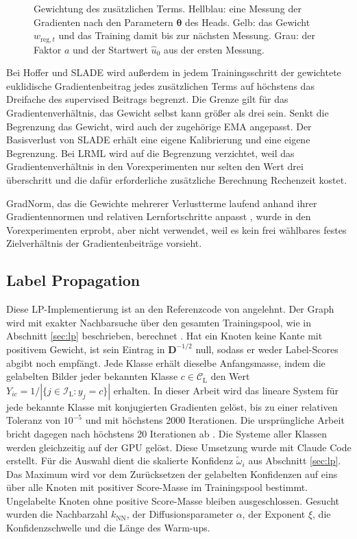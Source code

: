 \begin{figure}[tbp]
  \centering
  
  \caption[Gewichtung des zusätzlichen Terms]{Gewichtung des zusätzlichen Terms. Hellblau: eine Messung der Gradienten nach den Parametern $\bm{\theta}$ des Heads. Gelb: das Gewicht $w_{\mathrm{reg},t}$ und das Training damit bis zur nächsten Messung. Grau: der Faktor $a$ und der Startwert $\hat u_0$ aus der ersten Messung.}
  \label{fig:m:gewicht}
\end{figure}

Bei Hoffer und \ac{SLADE} wird außerdem in jedem Trainingsschritt der gewichtete euklidische Gradientenbeitrag jedes zusätzlichen Terms auf höchstens das Dreifache des supervised Beitrags begrenzt. Die Grenze gilt für das Gradientenverhältnis, das Gewicht selbst kann größer als drei sein. Senkt die Begrenzung das Gewicht, wird auch der zugehörige \ac{EMA} angepasst. Der Basisverlust von \ac{SLADE} erhält eine eigene Kalibrierung und eine eigene Begrenzung. Bei \ac{LRML} wird auf die Begrenzung verzichtet, weil das Gradientenverhältnis in den Vorexperimenten nur selten den Wert drei überschritt und die dafür erforderliche zusätzliche Berechnung Rechenzeit kostet.

GradNorm, das die Gewichte mehrerer Verlustterme laufend anhand ihrer Gradientennormen und relativen Lernfortschritte anpasst \cite{chen_gradnorm_2018}, wurde in den Vorexperimenten erprobt, aber nicht verwendet, weil es kein frei wählbares festes Zielverhältnis der Gradientenbeiträge vorsieht. 

\subsection{Label Propagation}
\label{sec:m:lp}

Diese \ac{LP}-Implementierung ist an den Referenzcode von \cite{iscen_label_2019} angelehnt. Der Graph wird mit exakter Nachbarsuche über den gesamten Trainingspool, wie in Abschnitt \ref{sec:lp} beschrieben, berechnet \cite{iscen_label_2019}. Hat ein Knoten keine Kante mit positivem Gewicht, ist sein Eintrag in $\bm{D}^{-1/2}$ null, sodass er weder Label-Scores abgibt noch empfängt. Jede Klasse erhält dieselbe Anfangsmasse, indem die gelabelten Bilder jeder bekannten Klasse $c\in\mathcal{C}_{\mathrm{L}}$ den Wert $Y_{ic}=1/|\{j\in\mathcal{I}_{\mathrm{L}}:y_j=c\}|$ erhalten. In dieser Arbeit wird das lineare System für jede bekannte Klasse mit konjugierten Gradienten gelöst, bis zu einer relativen Toleranz von $10^{-5}$ und mit höchstens \num{2000} Iterationen. Die ursprüngliche Arbeit bricht dagegen nach höchstens 20 Iterationen ab \cite{iscen_label_2019}. Die Systeme aller Klassen werden gleichzeitig auf der \ac{GPU} gelöst. Diese Umsetzung wurde mit Claude Code erstellt. Für die Auswahl dient die skalierte Konfidenz $\tilde\omega_i$ aus Abschnitt \ref{sec:lp}. Das Maximum wird vor dem Zurücksetzen der gelabelten Konfidenzen auf eins über alle Knoten mit positiver Score-Masse im Trainingspool bestimmt. Ungelabelte Knoten ohne positive Score-Masse bleiben ausgeschlossen. Gesucht wurden die Nachbarzahl $k_{\mathrm{NN}}$, der Diffusionsparameter $\alpha$, der Exponent $\xi$, die Konfidenzschwelle und die Länge des Warm-ups.

